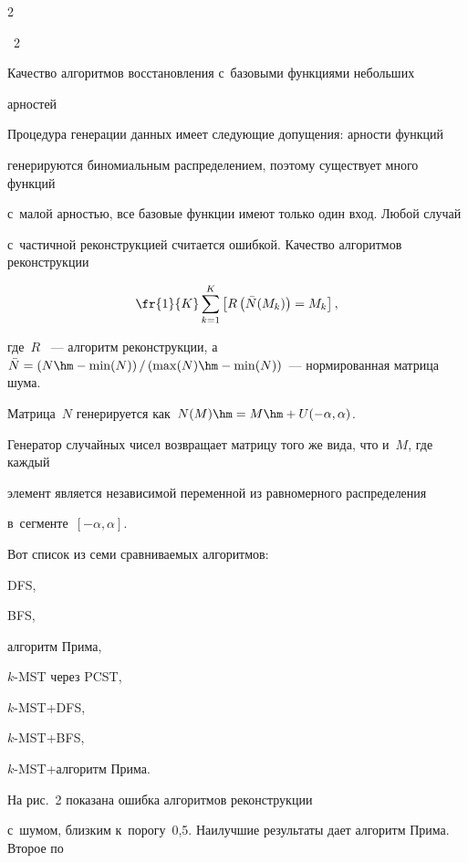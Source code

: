 \begin{multicols}{2}
{\noindent

{{\figurename~2}\ \ \small{Качество алгоритмов восстановления с~базовыми функциями небольших 

арностей

}}}






\addtocounter{figure}{1}



Процедура генерации данных имеет следующие допущения: арности функций 

генерируются биномиальным распределением, поэтому существует много функций 

с~малой арностью, все базовые функции имеют только один вход. Любой случай 

с~частичной реконструкцией считается ошибкой. Качество алгоритмов реконструкции

$$

\fr{1}{K}\sum\limits_{k=1}^K \left[ R\left( \bar{N}(M_k)\right)=M_k\right],

$$

где~$R$ ~--- алгоритм реконструкции, а~$\bar{N}=\left(N \hm-

\min(N)\right)/\left(\max(N)\hm-\min(N)\right)$~--- нормированная мат\-ри\-ца шума. 

Мат\-ри\-ца~$N$ генерируется как~$N(M)\hm=M\hm+U(-\alpha,\alpha)$.

Генератор случайных чисел возвращает матрицу того же вида, что и~$M$, где каждый 

элемент является независимой переменной из равномерного распределения 

в~сегменте~$[-\alpha,\alpha]$.



Вот список из семи сравниваемых алгоритмов:

DFS,

BFS,

алгоритм Прима,

$k$-MST через PCST,

$k$-MST\;+\;DFS,

$k$-MST\;+\;BFS,

$k$-MST\;+\;ал\-го\-ритм Прима.

На рис.~2 показана ошибка алгоритмов реконструкции 

с~шумом, близ\-ким к~порогу~0,5. Наилучшие результаты дает алгоритм Прима. Второе по 


\end{multicols}
